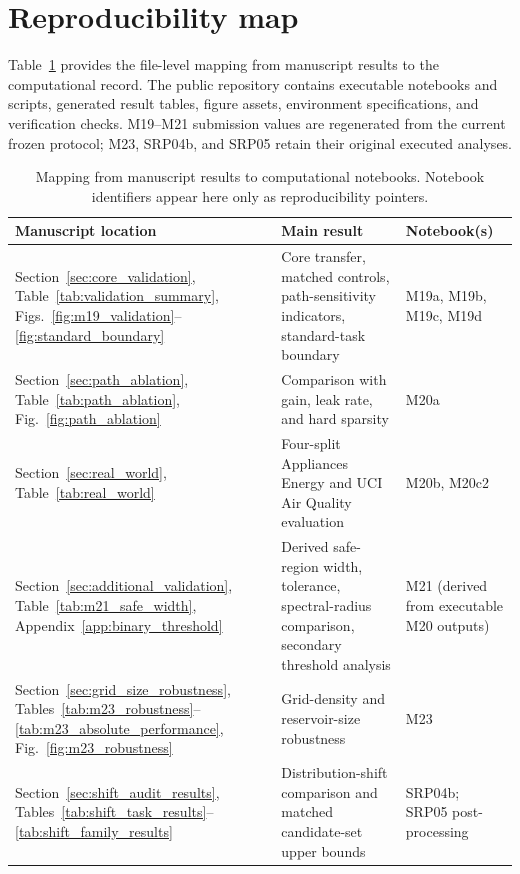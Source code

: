 \documentclass[11pt,a4paper]{article}
\begin{document}
\section{Reproducibility map}
\label{app:repro_map}

Table~\ref{tab:repro_map} provides the file-level mapping from manuscript results to the computational record. The public repository contains executable notebooks and scripts, generated result tables, figure assets, environment specifications, and verification checks. M19--M21 submission values are regenerated from the current frozen protocol; M23, SRP04b, and SRP05 retain their original executed analyses.

\begin{table}[H]
\centering
\caption{Mapping from manuscript results to computational notebooks. Notebook identifiers appear here only as reproducibility pointers.}
\label{tab:repro_map}
\footnotesize
\begin{tabularx}{\textwidth}{>{\raggedright\arraybackslash}p{}>{\raggedright\arraybackslash}p{}>{\raggedright\arraybackslash}X}
\toprule
Manuscript location & Main result & Notebook(s) \\
\midrule
Section~\ref{sec:core_validation}, Table~\ref{tab:validation_summary}, Figs.~\ref{fig:m19_validation}--\ref{fig:standard_boundary} & Core transfer, matched controls, path-sensitivity indicators, standard-task boundary & M19a, M19b, M19c, M19d \\
Section~\ref{sec:path_ablation}, Table~\ref{tab:path_ablation}, Fig.~\ref{fig:path_ablation} & Comparison with gain, leak rate, and hard sparsity & M20a \\
Section~\ref{sec:real_world}, Table~\ref{tab:real_world} & Four-split Appliances Energy and UCI Air Quality evaluation & M20b, M20c2 \\
Section~\ref{sec:additional_validation}, Table~\ref{tab:m21_safe_width}, Appendix~\ref{app:binary_threshold} & Derived safe-region width, tolerance, spectral-radius comparison, secondary threshold analysis & M21 (derived from executable M20 outputs) \\
Section~\ref{sec:grid_size_robustness}, Tables~\ref{tab:m23_robustness}--\ref{tab:m23_absolute_performance}, Fig.~\ref{fig:m23_robustness} & Grid-density and reservoir-size robustness & M23 \\
Section~\ref{sec:shift_audit_results}, Tables~\ref{tab:shift_task_results}--\ref{tab:shift_family_results} & Distribution-shift comparison and matched candidate-set upper bounds & SRP04b; SRP05 post-processing \\
\bottomrule
\end{tabularx}
\end{table}
\end{document}
